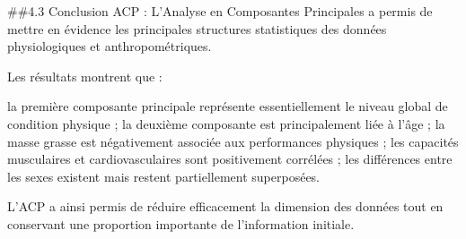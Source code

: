 \documentclass[
]{article}
\begin{document}
\#\#4.3 Conclusion ACP : L'Analyse en Composantes Principales a permis
de mettre en évidence les principales structures statistiques des
données physiologiques et anthropométriques.

Les résultats montrent que :

la première composante principale représente essentiellement le niveau
global de condition physique ; la deuxième composante est principalement
liée à l'âge ; la masse grasse est négativement associée aux
performances physiques ; les capacités musculaires et cardiovasculaires
sont positivement corrélées ; les différences entre les sexes existent
mais restent partiellement superposées.

L'ACP a ainsi permis de réduire efficacement la dimension des données
tout en conservant une proportion importante de l'information initiale.
\end{document}
